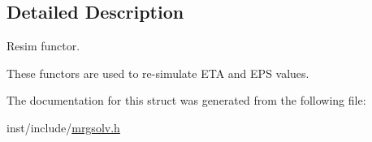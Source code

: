 \subsection{Detailed Description}
Resim functor. 

These functors are used to re-\/simulate {\ttfamily E\+TA} and {\ttfamily E\+PS} values. 

The documentation for this struct was generated from the following file\+:\begin{DoxyCompactItemize}
\item 
inst/include/\hyperlink{mrgsolv_8h}{mrgsolv.\+h}\end{DoxyCompactItemize}
